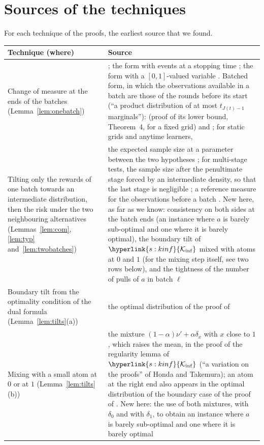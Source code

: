 \documentclass[10pt]{article}
\newcommand{\sy}[2]{{\hyperlink{#1}{#2}}}
\newcommand{\1}{\mathbf{1}}
\newcommand{\Ki}{\sy{s:kinf}{\mathcal K_{\inf}}}
\begin{document}
\section{Sources of the techniques}\label{sec:attribution}

For each technique of the proofs, the earliest source that we found.

\begin{center}\small
\begin{tabular}{p{}p{}}
\toprule
Technique (where) & Source \\
\midrule
Change of measure at the ends of the batches (Lemma~\ref{lem:onebatch}) & \citet{LR85}; the form with
events at a stopping time \citet[Lemma~1]{KCG16}; the form with a $[0,1]$-valued variable \citet[Lemma~1 and (6)]{GMS19}.
Batched form, in which the observations available in a batch are those of the rounds before its start (``a product
distribution of at most $t_{J(t)-1}$ marginals''): \citet[Appendix~A]{PRCS16} (proof of its lower bound, Theorem~4, for a
fixed grid) and \citet[Section~3.1]{GHRZ19}; for static grids and anytime learners, \citet[Appendix~C]{JTXHXG21} \\
Tilting only the rewards of one batch towards an intermediate distribution, then the risk under the two neighbouring
alternatives (Lemmas~\ref{lem:com}, \ref{lem:typ} and~\ref{lem:twobatches}) & the expected sample size at a parameter
between the two hypotheses \citet{H60}; for multi-stage tests, the sample size after the penultimate stage forced by an
intermediate density, so that the last stage is negligible \citet[Theorem~3 and its proof]{L83}; a reference measure for
the observations before a batch \citet[Section~3.2, Lemmas~4--5 and Appendices~B.4--B.5]{GHRZ19}. New here, as far as we
know: consistency on both sides at the batch ends (an instance where $a$ is barely sub-optimal and one where it is barely
optimal), the boundary tilt of $\Ki$ mixed with atoms at $0$ and $1$ (for the mixing step itself, see two rows below), and the tightness of the number of pulls of $a$ in
batch $\ell$ \\
Boundary tilt from the optimality condition of the dual formula (Lemma~\ref{lem:tilts}(a)) & the optimal distribution of
the proof of \citet[Theorem~8]{HT10} \\
Mixing with a small atom at $0$ or at $1$ (Lemma~\ref{lem:tilts}(b)) & the mixture $(1-\alpha)\nu'+\alpha\delta_x$ with $x$
close to $1$, which raises the mean, in the proof of the regularity lemma of $\Ki$ \citet[Appendix~B.1]{GHMS22} (``a variation
on the proofs'' of Honda and Takemura); an atom at the right end also appears in the optimal distribution of the boundary case
of the proof of \citet[Theorem~8]{HT10}. New here: the use of both mixtures, with $\delta_0$ and with $\delta_1$, to obtain an
instance where $a$ is barely sub-optimal and one where it is barely optimal \\
\bottomrule
\end{tabular}


\end{center}
\end{document}
